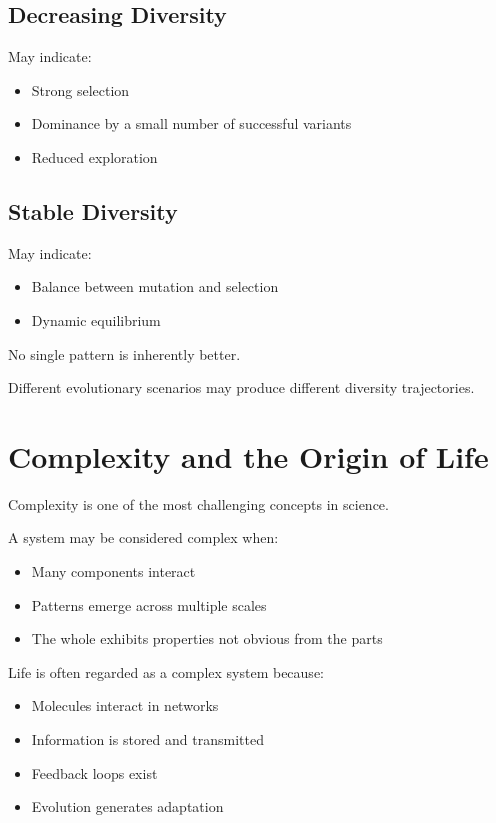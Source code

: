 \documentclass[
  oneside,
  openany]{book}
\providecommand{\tightlist}{%
  \setlength{\itemsep}{0pt}\setlength{\parskip}{0pt}}
\begin{document}
\subsection{Decreasing Diversity}\label{decreasing-diversity-1}

May indicate:

\begin{itemize}
\tightlist
\item
  Strong selection
\item
  Dominance by a small number of successful variants
\item
  Reduced exploration
\end{itemize}

\subsection{Stable Diversity}\label{stable-diversity}

May indicate:

\begin{itemize}
\tightlist
\item
  Balance between mutation and selection
\item
  Dynamic equilibrium
\end{itemize}

No single pattern is inherently better.

Different evolutionary scenarios may produce different diversity trajectories.

\section{Complexity and the Origin of Life}\label{complexity-and-the-origin-of-life}

Complexity is one of the most challenging concepts in science.

A system may be considered complex when:

\begin{itemize}
\tightlist
\item
  Many components interact
\item
  Patterns emerge across multiple scales
\item
  The whole exhibits properties not obvious from the parts
\end{itemize}

Life is often regarded as a complex system because:

\begin{itemize}
\tightlist
\item
  Molecules interact in networks
\item
  Information is stored and transmitted
\item
  Feedback loops exist
\item
  Evolution generates adaptation
\end{itemize}
\end{document}
